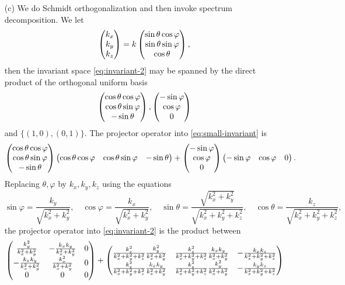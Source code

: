 \documentclass[hyperref, a4paper]{article}
\begin{document}
\begin{itemize}
\item[(c)] We do Schmidt orthogonalization and then invoke spectrum decomposition.
We let 
\[
    \pmqty{k_x \\ k_y \\ k_z} = k \pmqty{\sin \theta \cos \varphi \\ \sin \theta \sin \varphi \\ \cos \theta},  
\]
then the invariant space \eqref{eq:invariant-2} may be spanned by the direct product of the orthogonal uniform basis
\begin{equation}
    \pmqty{\cos \theta \cos \varphi \\ \cos \theta \sin \varphi \\ - \sin \theta}, 
    \pmqty{- \sin \varphi \\ \cos \varphi \\ 0}
    \label{eq:small-invariant}
\end{equation}
and $\{(1, 0), (0, 1)\}$. The projector operator into \eqref{eq:small-invariant} is 
\[
    \pmqty{\cos \theta \cos \varphi \\ \cos \theta \sin \varphi \\ - \sin \theta} 
    \pmqty{\cos \theta \cos \varphi & \cos \theta \sin \varphi & - \sin \theta} + 
    \pmqty{- \sin \varphi \\ \cos \varphi \\ 0} \pmqty{- \sin \varphi & \cos \varphi & 0} .
\]
Replacing $\theta, \varphi$ by $k_x, k_y, k_z$ using the equations 
\[
    \sin \varphi = \frac{k_y}{\sqrt{k_x^2 + k_y^2}}, \quad 
    \cos \varphi = \frac{k_x}{\sqrt{k_x^2 + k_y^2}}, \quad 
    \sin \theta = \frac{\sqrt{k_x^2 + k_y^2}}{\sqrt{k_x^2 + k_y^2 + k_z^2}}, \quad 
    \cos \theta = \frac{k_z}{\sqrt{k_x^2 + k_y^2 + k_z^2}},
\]
the projector operator into \eqref{eq:invariant-2} is the product between
\[
    \pmqty{ \frac{k_y^2}{k_x^2 + k_y^2} & - \frac{k_x k_y}{k_x^2 + k_y^2} & 0
    \\ - \frac{k_x k_y}{k_x^2 + k_y^2} & \frac{k_x^2}{k_x^2 + k_y^2} & 0 \\
    0 & 0 & 0} +
    \pmqty{
        \frac{k_z^2}{k_x^2 + k_y^2 + k_z^2} \frac{k_y^2}{k_x^2 + k_y^2} &
        \frac{k_z^2}{k_x^2 + k_y^2 + k_z^2} \frac{k_x k_y}{k_x^2 + k_y^2} &
        - \frac{k_x k_z}{k_x^2 + k_y^2 + k_z^2} \\
        \frac{k_z^2}{k_x^2 + k_y^2 + k_z^2} \frac{k_x k_y}{k_x^2 + k_y^2} &
        \frac{k_z^2}{k_x^2 + k_y^2 + k_z^2} \frac{k_y^2}{k_x^2 + k_y^2} & 
        - \frac{k_y k_z}{k_x^2 + k_y^2 + k_z^2} \\
}\]
\end{itemize}
\end{document}
